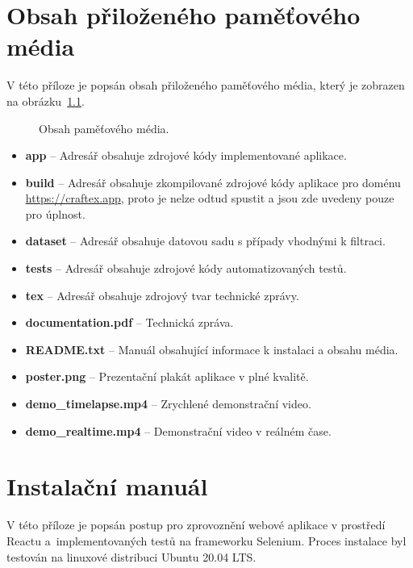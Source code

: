 \chapter{Obsah přiloženého paměťového média}
V této příloze je popsán obsah přiloženého paměťového média, který je zobrazen na obrázku~\ref{obr:ObsahMedia}.
\begin{figure}[H]
	\centering
	\setlength{\fboxsep}{4pt}
	\caption{Obsah paměťového média.}
	\label{obr:ObsahMedia}
\end{figure}
\begin{itemize}
    \item \textbf{app} -- Adresář obsahuje zdrojové kódy implementované aplikace.
    \item \textbf{build} -- Adresář obsahuje zkompilované zdrojové kódy aplikace pro doménu \url{https://craftex.app}, proto je nelze odtud spustit a jsou zde uvedeny pouze pro úplnost.
    \item \textbf{dataset} -- Adresář obsahuje datovou sadu s případy vhodnými k filtraci.
    \item \textbf{tests} -- Adresář obsahuje zdrojové kódy automatizovaných testů.
    \item \textbf{tex} -- Adresář obsahuje zdrojový tvar technické zprávy.
    \item \textbf{documentation.pdf} -- Technická zpráva.
    \item \textbf{README.txt} -- Manuál obsahující informace k instalaci a obsahu média.
    \item \textbf{poster.png} -- Prezentační plakát aplikace v plné kvalitě.
    \item \textbf{demo\_timelapse.mp4} -- Zrychlené demonstrační video.
    \item \textbf{demo\_realtime.mp4} -- Demonstrační video v reálném čase.
\end{itemize}

\chapter{Instalační manuál}
V této příloze je popsán postup pro zprovoznění webové aplikace v prostředí Reactu a~implementovaných testů na frameworku Selenium. Proces instalace byl testován na linuxové distribuci Ubuntu 20.04 LTS.


